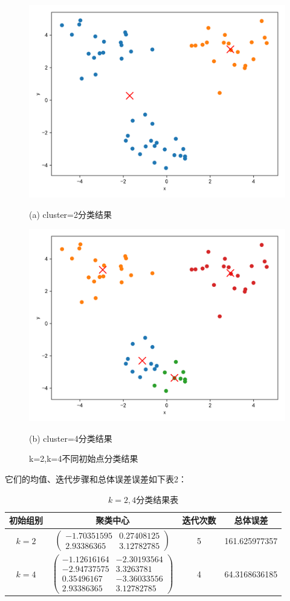 \documentclass{article}
\begin{document}
\begin{figure}[htbp]
	\begin{minipage}{0.48\linewidth}
		\centerline{\includegraphics[width=0.7\linewidth]{img//fig5.png}}
		\centerline{(a) cluster=2分类结果}
	\end{minipage}
	\begin{minipage}{.48\linewidth}
		\centerline{\includegraphics[width=0.7\linewidth]{img//fig6.png}}
		\centerline{(b)  cluster=4分类结果}
	\end{minipage}

	\caption{k=2,k=4不同初始点分类结果}
\end{figure}

它们的均值、迭代步骤和总体误差误差如下表2：


\begin{table}[htbp]
	\centering
	\begin{tabular}{cccc}
		\hline
		初始组别 & 聚类中心 & 迭代次数 & 总体误差 \\
		\hline 
		$k=2$ & $\left( \begin{array}{cc}
		-1.70351595 &  0.27408125 \\
		2.93386365 & 3.12782785
		\end{array}\right)$  & 5 & 161.625977357  \\[0.5cm]
		$k=4$ & $\left(\begin{array}{cc}
     	-1.12616164 & -2.30193564 \\
	    -2.94737575 & 3.3263781 \\
	    0.35496167 & -3.36033556 \\
	    2.93386365 & 3.12782785
		\end{array}\right)$  & 4 & 64.3168636185 \\
		\hline 
	\end{tabular}
\caption{$k=2,4$分类结果表}
\end{table}
\end{document}

